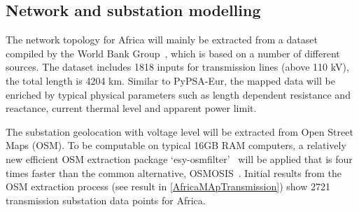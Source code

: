\documentclass[conference, a4paper]{IEEEtran}
\begin{document}


	



\subsection{Network and substation modelling} %
The network topology for Africa will mainly be extracted from a dataset compiled by the World Bank Group~\cite{arderne-2017}, which is based on a number of different sources. The dataset includes 1818 inputs for transmission lines (above 110 kV), the total length is 4204 km. Similar to PyPSA-Eur\cite{PyPSAEur}, the mapped data will be enriched by typical physical parameters such as length dependent resistance and reactance, current thermal level and apparent power limit.

The substation geolocation with voltage level will be extracted from Open Street Maps (OSM). To be computable on typical 16GB RAM computers, a relatively new efficient OSM extraction package `esy-osmfilter'~\cite{pluta-lunsdorf-2020} will be applied that is four times faster than the common alternative, OSMOSIS~\cite{henderson-2020}. Initial results from the OSM extraction process (see result in \cref{AfricaMApTransmission}) show 2721 transmission substation data points for Africa.
\end{document}
